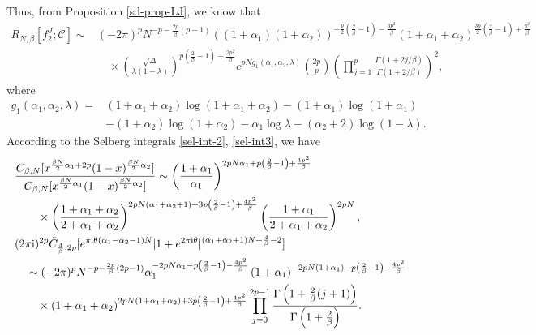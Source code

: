 \documentclass[11pt,a4paper]{article}
\numberwithin{equation}{section} %
\theoremstyle{plain}
\theoremstyle{definition}
\numberwithin{prop}{section}
\numberwithin{cor}{section}
\numberwithin{remark}{section}
\begin{document}
Thus, from Proposition \ref{sd-prop-LJ}, we know that 
\begin{align*}
    R_{N,\beta}[f_2^J;\mathcal{C}]\sim& (-2\pi)^pN^{-p-\frac{2p}{\beta}(p-1)}\left((1+\alpha_1)(1+\alpha_2)\right)^{-\frac{p}{2}\left(\frac{2}{\beta}-1\right)-\frac{3p^2}{\beta}}(1+\alpha_1+\alpha_2)^{\frac{3p}{2}\left(\frac{2}{\beta}-1\right)+\frac{p^2}{\beta}}\\
    &\quad\times\left(\frac{\sqrt{\Delta}}{\lambda(1-\lambda)}\right)^{p\left(\frac{2}{\beta}-1\right)+\frac{2p^2}{\beta}}e^{pNg_1(\alpha_1,\alpha
    _2,\lambda)}\binom{2 p}{p} \left(\prod_{j=1}^p \frac{\Gamma(1+2 j / \beta)}{\Gamma(1+2 / \beta)}\right)^2,
\end{align*}
where
\begin{align*}
    g_1(\alpha_1,\alpha
    _2,\lambda)=&(1+\alpha_1+\alpha_2)\log (1+\alpha_1+\alpha_2)-(1+\alpha_1)\log(1+\alpha_1)\\
    &-(1+\alpha_2)\log(1+\alpha_2)-\alpha_1\log \lambda-(\alpha_2+2)\log(1-\lambda).
\end{align*}
According to the Selberg integrals \eqref{sel-int-2}, \eqref{sel-int3}, we have
\begin{align}
&  \begin{aligned}
    &\frac{C_{\beta,N}[x^{\frac{\beta N}{2}\alpha_1+2p}(1-x)^{\frac{\beta N}{2}\alpha_2}]}{C_{\beta,N}[x^{\frac{\beta N}{2}\alpha_1}(1-x)^{\frac{\beta N}{2}\alpha_2}]}\sim \left(\frac{1+\alpha_1}{\alpha_1}\right)^{2 p N \alpha_1+p\left(\frac{2}{\beta}-1\right)+\frac{4 p^2}{\beta}}\\
    &\qquad\times\left(\frac{1+\alpha_1+\alpha_2}{2+\alpha_1+\alpha_2}\right)^{2 p N\left(\alpha_1+\alpha_2+1\right)+3 p\left(\frac{2}{\beta}-1\right)+\frac{4 p^2}{\beta}} \left(\frac{1+\alpha_1}{2+\alpha_1+\alpha_2}\right)^{2 p N},
\end{aligned}
    \\
   &\begin{aligned}
        &(2\pi \mathrm{i})^{2p}\tilde{C}_{\frac{4}{\beta},2p}[e^{\pi \mathrm{i}\theta(\alpha_1-\alpha_2-1)N}|1+e^{2\pi \mathrm{i}\theta}|^{(\alpha_1+\alpha_2+1)N+\frac{4}{\beta}-2}]\\
    &\quad \sim (-2 \pi)^p N^{-p-\frac{2 p}{\beta}(2 p-1)} \alpha_1^{-2 p N \alpha_1-p\left(\frac{2}{\beta}-1\right)-\frac{4 p^2}{\beta}}\left(1+\alpha_1\right)^{-2 p N\left(1+\alpha_1\right)-p\left(\frac{2}{\beta}-1\right)-\frac{4 p^2}{\beta}}\\
&\qquad\times\left(1+\alpha_1+\alpha_2\right)^{2 p N\left(1+\alpha_1+\alpha_2\right)+3 p\left(\frac{2}{\beta}-1\right)+\frac{4 p^2}{\beta}}\prod_{j=0}^{2p-1}\frac{\Gamma\left(1+{2\over\beta}(j+1)\right)}{\Gamma\left(1+\frac{2}{\beta}\right)}.
    \end{aligned}
\end{align}
\end{document}
